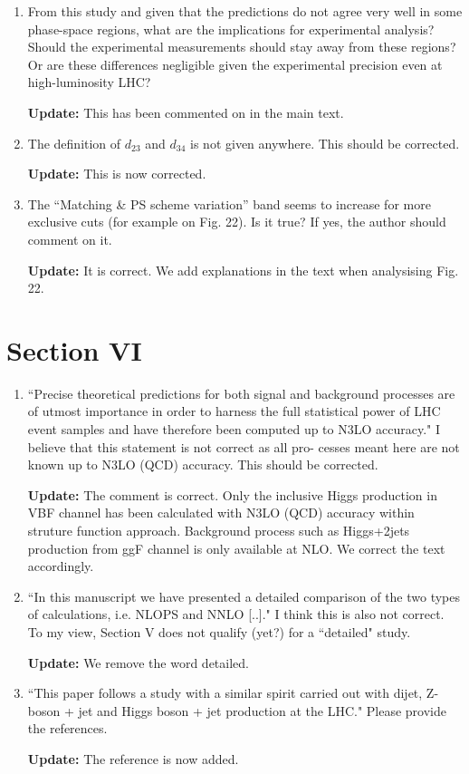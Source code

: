 \documentclass[12pt]{article}
\begin{document}
\begin{enumerate}
  {\bf Update:} This has been commented on in the text.

\item From this study and given that the predictions do not agree very well in some phase-space regions, what are the implications for experimental analysis? Should the experimental measurements should stay away from these regions? Or are these differences negligible given the experimental precision even at high-luminosity LHC?

  {\bf Update:} This has been commented on in the main text.

\item The definition of $d_{23}$ and $d_{34}$ is not given anywhere. This should be corrected.

  {\bf Update:} This is now corrected.

\item The “Matching \& PS scheme variation” band seems to increase for more exclusive cuts (for example on Fig. 22). Is it true? If yes, the author should comment on it.

{\bf Update:} It is correct. We add explanations in the text when analysising Fig. 22.

\end{enumerate}
\section*{Section VI}
\begin{enumerate}
\item ``Precise theoretical predictions for both signal and background processes are of utmost importance in order to harness the full statistical power of LHC event samples and have therefore been computed up to N3LO accuracy." I believe that this statement is not correct as all pro- cesses meant here are not known up to N3LO (QCD) accuracy. This should be corrected.

{\bf Update:} The comment is correct. Only the inclusive Higgs production in VBF channel has been calculated with N3LO (QCD) accuracy within struture function approach. Background process such as Higgs+2jets production from ggF channel is only available at NLO. We correct the text accordingly. 

\item ``In this manuscript we have presented a detailed comparison of the two types of calculations, i.e. NLOPS and NNLO [..]." I think this is also not correct. To my view, Section V does not qualify (yet?) for a ``detailed" study.

{\bf Update:} We remove the word detailed.


\item ``This paper follows a study with a similar spirit carried out with dijet, Z-boson + jet and Higgs boson + jet production at the LHC." Please provide the references.

{\bf Update:} The reference is now added.
\end{enumerate}
\end{document}
